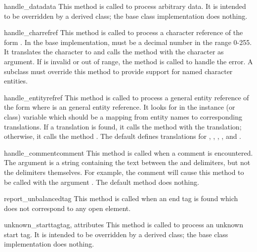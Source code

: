 \begin{methoddesc}{handle_data}{data}
This method is called to process arbitrary data.  It is intended to be
overridden by a derived class; the base class implementation does
nothing.
\end{methoddesc}

\begin{methoddesc}{handle_charref}{ref}
This method is called to process a character reference of the form
.  In the base implementation,  must
be a decimal number in the
range 0-255.  It translates the character to \ASCII{} and calls the
method  with the character as argument.  If
 is invalid or out of range, the method
 is called to handle the error.  A
subclass must override this method to provide support for named
character entities.
\end{methoddesc}

\begin{methoddesc}{handle_entityref}{ref}
This method is called to process a general entity reference of the
form  where  is an general entity
reference.  It looks for  in the instance (or class)
variable  which should be a mapping from entity
names to corresponding translations.  If a translation is found, it
calls the method  with the translation;
otherwise, it calls the method .
The default  defines translations for
, , , , and
.
\end{methoddesc}

\begin{methoddesc}{handle_comment}{comment}
This method is called when a comment is encountered.  The
 argument is a string containing the text between the
\samp{<!--} and \samp{-->} delimiters, but not the delimiters
themselves.  For example, the comment  will
cause this method to be called with the argument .  The
default method does nothing.
\end{methoddesc}

\begin{methoddesc}{report_unbalanced}{tag}
This method is called when an end tag is found which does not
correspond to any open element.
\end{methoddesc}

\begin{methoddesc}{unknown_starttag}{tag, attributes}
This method is called to process an unknown start tag.  It is intended
to be overridden by a derived class; the base class implementation
does nothing.
\end{methoddesc}

